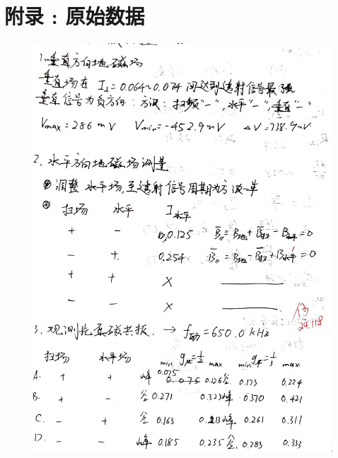 \documentclass[10pt,hyperref,a4paper,UTF8]{ctexart}
\begin{document}

\newpage
\appendix
\section{附录 : 原始数据}
\begin{figure}[thbp!]
        \centering
        \begin{minipage}[t]{0.49\linewidth}
            \centering
            \includegraphics[width=\linewidth]{figures/appedix1.jpg}
        \end{minipage}
        \begin{minipage}[t]{0.49\linewidth}
            \centering

\end{minipage}
\end{figure}
\end{document}
